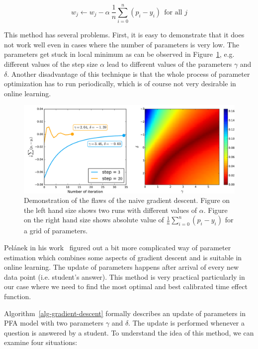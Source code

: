 \begin{equation} \label{online-learning-batch-rule}
 w_j \gets w_j - \alpha~\frac{1}{n}\sum_{i=0}^n (p_i - y_i)~~\text{for all } j
\end{equation}

This method has several problems. First, it is easy to demonstrate that it does not work well even in cases where the number of parameters is very low. The parameters get stuck in local minimum as can be observed in Figure~\ref{pfa-dummy-gd-step-vs-grid}, e.g. different values of the step size $\alpha$ lead to different values of the parameters $\gamma$ and $\delta$. Another disadvantage of this technique is that the whole process of parameter optimization has to run periodically, which is of course not very desirable in online learning.

\begin{figure}[htbp]
  \centering
  \includegraphics[width=\textwidth]{img/pfa-dummy-gd-step-vs-grid}
  \caption{Demonstration of the flaws of the naive gradient descent. Figure on the left hand size shows two runs with different values of $\alpha$. Figure on the right hand size shows absolute value of $\frac{1}{n}\sum_{i=0}^n (p_i - y_i)$ for a grid of parameters.}
  \label{pfa-dummy-gd-step-vs-grid}
\end{figure}

Pelánek in his work~\cite{Pelanek2015} figured out a bit more complicated way of parameter estimation which combines some aspects of gradient descent and is suitable in online learning. The update of parameters happens after arrival of every new data point (i.e. student's answer). This method is very practical particularly in our case where we need to find the most optimal and best calibrated time effect function.

Algorithm~\ref{alg-gradient-descent} formally describes an update of parameters in PFA model with two parameters $\gamma$ and $\delta$. The update is performed whenever a question is answered by a student. To understand the idea of this method, we can examine four situations:

